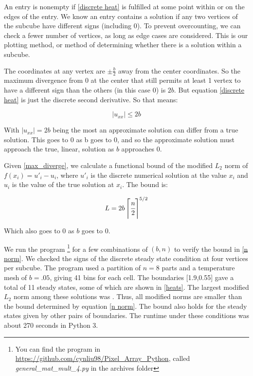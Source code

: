 \documentclass[11pt]{article}
\begin{document}
An entry is nonempty if \cref{discrete heat} is fulfilled at some point within or on the edges of the entry. We know an entry contains a solution if any two vertices of the subcube have different signs (including 0). To prevent overcounting, we can check a fewer number of vertices, as long as edge cases are considered. This is our plotting method, or method of determining whether there is a solution within a subcube.

The coordinates at any vertex are $\pm \frac{b}{2}$ away from the center coordinates. So the maximum divergence from 0 at the center that still permits at least 1 vertex to have a different sign than the others (in this case 0) is $2b$. But equation \cref{discrete heat} is just the discrete second derivative. So that means:

\begin{equation}
    \label{max_diverge}
    |u_{xx}| \le 2b
\end{equation}

\noindent With $|u_{xx}| = 2b$ being the most an approximate solution can differ from a true solution. This goes to 0 as b goes to 0, and so the approximate solution must approach the true, linear, solution as $b$ approaches 0.

Given \cref{max_diverge}, we calculate a functional bound of the modified $L_2$ norm of $f(x_i) = u'_i-u_i$, where $u'_i$ is the discrete numerical solution at the value $x_i$ and $u_i$ is the value of the true solution at $x_i$. The bound is:

\begin{equation}
\label{n norm}
L = 2b \left \lceil \cfrac{n}{2} \right \rceil^{5/2}
\end{equation}

\noindent Which also goes to 0 as $b$ goes to 0. 

We run the program \footnote{You can find the program in \url{https://github.com/cynliu98/Pixel\_Array\_Python}, called \textit{general\_mat\_mult\_4.py} in the archives folder} for a few combinations of $(b,n)$ to verify the bound in \eqref{n norm}. We checked the signs of the discrete steady state condition at four vertices per subcube. The program used a partition of $n=8$ parts and a temperature mesh of $b = .05$, giving 41 bins for each cell. The boundaries [1.9,0.55] gave a total of 11 steady states, some of which are shown in \cref{heats}. The largest modified $L_2$ norm among these solutions was . Thus, all modified norms are smaller than the bound determined by equation \cref{n norm}. The bound also holds for the steady states given by other pairs of boundaries. The runtime under these conditions was about 270 seconds in Python 3.
\end{document}
